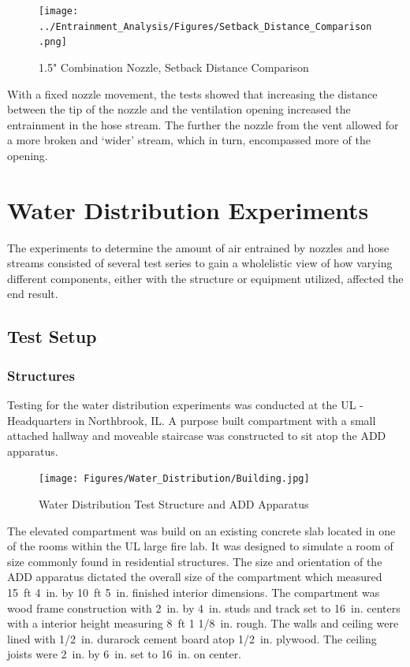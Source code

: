 \documentclass{article}
\begin{document}
\begin{figure}[!ht]
	\centering
	\texttt{[image: ../Entrainment\_Analysis/Figures/Setback\_Distance\_Comparison.png]}
	\caption{1.5" Combination Nozzle, Setback Distance Comparison}
	\label{fig:1_5_Combination_Nozzle_Setback_Distance_Comparison}
\end{figure}

With a fixed nozzle movement, the tests showed that increasing the distance between the tip of the nozzle and the ventilation opening increased the entrainment in the hose stream. The further the nozzle from the vent allowed for a more broken and `wider' stream, which in turn, encompassed more of the opening.

\vspace*{\baselineskip}

\clearpage

\section{Water Distribution Experiments}

The experiments to determine the amount of air entrained by nozzles and hose streams consisted of several test series to gain a wholelistic view of how varying different components, either with the structure or equipment utilized, affected the end result.

\subsection{Test Setup}

\subsubsection{Structures}

Testing for the water distribution experiments was conducted at the UL - Headquarters in Northbrook, IL. A purpose built compartment with a small attached hallway and moveable staircase was constructed to sit atop the ADD apparatus.

\begin{figure}[!ht]
	\centering
	\texttt{[image: Figures/Water\_Distribution/Building.jpg]}
	\caption{Water Distribution Test Structure and ADD Apparatus}
	\label{fig:Water_Distribution_Test_Structure_and_ADD_Apparatus}
\end{figure}

The elevated compartment was build on an existing concrete slab located in one of the rooms within the UL large fire lab. It was designed to simulate a room of size commonly found in residential structures. The size and orientation of the ADD apparatus dictated the overall size of the compartment which measured 15~ft 4~in. by 10~ft 5~in. finished interior dimensions. The compartment was wood frame construction with 2~in. by 4~in. studs and track set to 16~in. centers with a interior height measuring 8~ft 1 1/8~in. rough. The walls and ceiling were lined with 1/2~in. durarock cement board atop 1/2~in. plywood. The ceiling joists were 2~in. by 6~in. set to 16~in. on center. 
\end{document}
